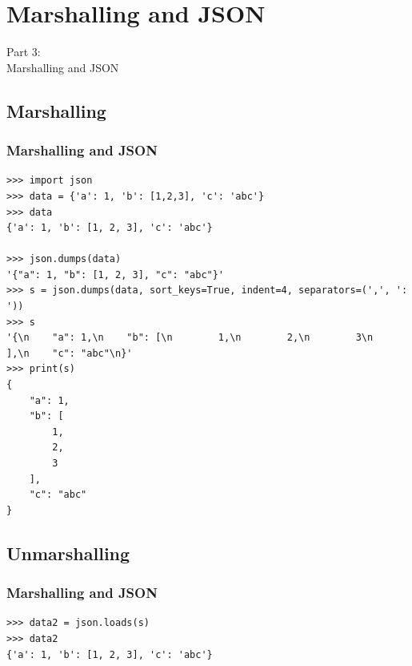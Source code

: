 {
\renewcommand{\bgcolor}{json}

\section{Marshalling and JSON}
\begin{frame}
    \vspace{25mm}
    \begin{center}
        \Huge{Part 3:\\Marshalling and JSON}
    \end{center}
\end{frame}

\subsection{Marshalling}
\begin{frame}[fragile]
  \frametitle{Marshalling and JSON }
  \vspace{0mm}
  \begin{verbatim}
>>> import json
>>> data = {'a': 1, 'b': [1,2,3], 'c': 'abc'}
>>> data
{'a': 1, 'b': [1, 2, 3], 'c': 'abc'}

>>> json.dumps(data)
'{"a": 1, "b": [1, 2, 3], "c": "abc"}'
>>> s = json.dumps(data, sort_keys=True, indent=4, separators=(',', ': '))
>>> s
'{\n    "a": 1,\n    "b": [\n        1,\n        2,\n        3\n    ],\n    "c": "abc"\n}'
>>> print(s)
{
    "a": 1,
    "b": [
        1,
        2,
        3
    ],
    "c": "abc"
}
  \end{verbatim}
\end{frame}

\subsection{Unmarshalling}
\begin{frame}[fragile]
  \frametitle{Marshalling and JSON }
  \vspace{0mm}
  \begin{verbatim}
>>> data2 = json.loads(s)
>>> data2
{'a': 1, 'b': [1, 2, 3], 'c': 'abc'}
  \end{verbatim}
\end{frame}

}


